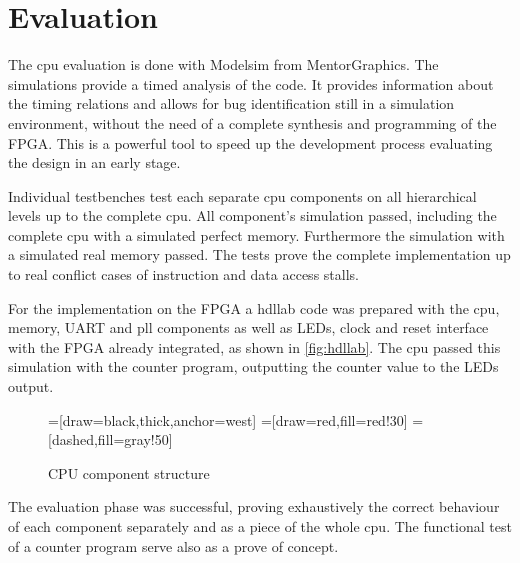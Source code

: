 \chapter{Evaluation}
The cpu evaluation is done with Modelsim from MentorGraphics. The simulations provide a timed analysis of the code. It provides information
about the timing relations and allows for bug identification still in a simulation environment, without the need of a complete synthesis
and programming of the FPGA. This is a powerful tool to speed up the development process evaluating the design in an early stage.

Individual testbenches test each separate cpu components on all hierarchical levels up to the complete cpu.
All component's simulation passed, including the complete cpu with a simulated perfect memory. Furthermore the
simulation with a simulated real memory passed. The tests prove the complete implementation up to real conflict cases of instruction and data access stalls.

For the implementation on the FPGA a hdllab code was prepared with the cpu, memory, UART and pll components as well as LEDs, clock and reset interface
with the FPGA already integrated, as shown in \autoref{fig:hdllab}. The cpu passed this simulation with the counter program, outputting the counter value to the LEDs output. 

\begin{figure}[h!]
\begin{center}
 =[draw=black,thick,anchor=west]
=[draw=red,fill=red!30]
=[dashed,fill=gray!50]
\caption{CPU component structure}
\label{fig:hdllab}
\end{center}
\end{figure}
The evaluation phase was successful, proving exhaustively the correct behaviour of each component separately and as a piece of the whole cpu. The functional
test of a counter program serve also as a prove of concept. 